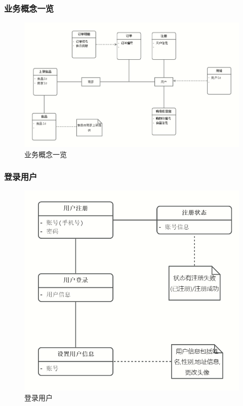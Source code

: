 \subsubsection{业务概念一览}
\begin{figure}[h]
    \centering
    \includegraphics[width=0.90\linewidth]{pics/1.png}
    \caption{业务概念一览}
    \label{fig:ywgn}
\end{figure}

\subsubsection{登录用户}

\begin{figure}[h]
    \centering
    \includegraphics[width=0.5\linewidth]{pics/2.png}
    \caption{登录用户}
    \label{fig:dlyh}
\end{figure}

